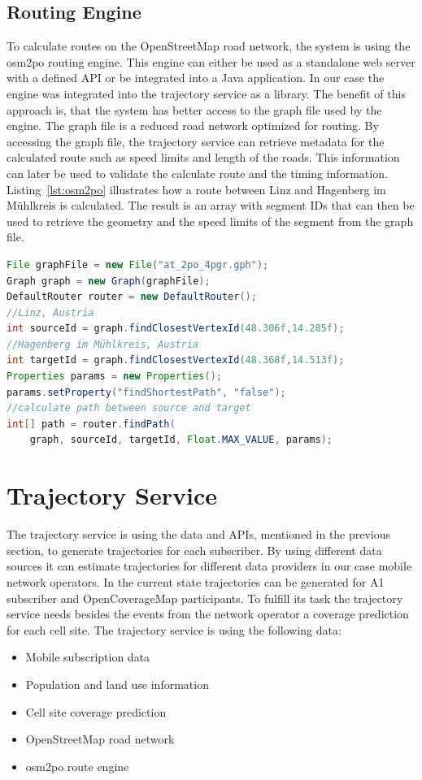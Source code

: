 \documentclass[master,english]{hgbthesis}
\begin{document}
\subsection{Routing Engine}
To calculate routes on the OpenStreetMap road network, the system is using the osm2po routing engine. This engine can either be used as a standalone web server with a defined API or be integrated into a Java application. In our case the engine was integrated into the trajectory service as a library. The benefit of this approach is, that the system has better access to the graph file used by the engine. The graph file is a reduced road network optimized for routing. By accessing the graph file, the trajectory service can retrieve metadata for the calculated route such as speed limits and length of the roads. This information can later be used to validate the calculate route and the timing information.
Listing~\ref{lst:osm2po} illustrates how a route between Linz and Hagenberg im Mühlkreis is calculated. The result is an array with segment IDs that can then be used to retrieve the geometry and the speed limits of the segment from the graph file.
\begin{lstlisting}[language=Java,style=JAVA,caption={Example code to calculate a route between two points},label={lst:osm2po}]
File graphFile = new File("at_2po_4pgr.gph");
Graph graph = new Graph(graphFile);
DefaultRouter router = new DefaultRouter();
//Linz, Austria
int sourceId = graph.findClosestVertexId(48.306f,14.285f);
//Hagenberg im Mühlkreis, Austria
int targetId = graph.findClosestVertexId(48.368f,14.513f);
Properties params = new Properties();
params.setProperty("findShortestPath", "false");
//calculate path between source and target
int[] path = router.findPath(
    graph, sourceId, targetId, Float.MAX_VALUE, params);
\end{lstlisting}
\section{Trajectory Service}
The trajectory service is using the data and APIs, mentioned in the previous section, to generate trajectories for each subscriber. By using different data sources it can estimate trajectories for different data providers in our case mobile network operators. In the current state trajectories can be generated for A1 subscriber and OpenCoverageMap participants. To fulfill its task the trajectory service needs besides the events from the network operator a coverage prediction for each cell site. The trajectory service is using the following data:
\begin{itemize}
\item Mobile subscription data
\item Population and land use information
\item Cell site coverage prediction
\item OpenStreetMap road network
\item osm2po route engine
\end{itemize}
\end{document}
